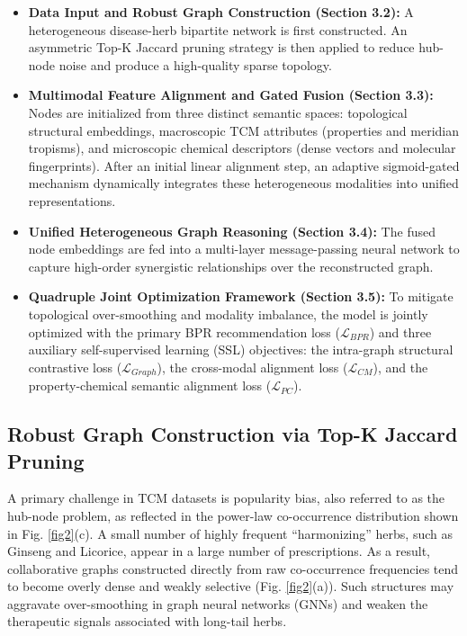\documentclass[a4paper,fleqn]{cas-dc}
\begin{document}
\begin{itemize}
    \item \textbf{Data Input and Robust Graph Construction (Section 3.2):} A heterogeneous disease-herb bipartite network is first constructed. An asymmetric Top-K Jaccard pruning strategy is then applied to reduce hub-node noise and produce a high-quality sparse topology.
    \item \textbf{Multimodal Feature Alignment and Gated Fusion (Section 3.3):} Nodes are initialized from three distinct semantic spaces: topological structural embeddings, macroscopic TCM attributes (properties and meridian tropisms), and microscopic chemical descriptors (dense vectors and molecular fingerprints). After an initial linear alignment step, an adaptive sigmoid-gated mechanism dynamically integrates these heterogeneous modalities into unified representations.
    \item \textbf{Unified Heterogeneous Graph Reasoning (Section 3.4):} The fused node embeddings are fed into a multi-layer message-passing neural network to capture high-order synergistic relationships over the reconstructed graph.
    \item \textbf{Quadruple Joint Optimization Framework (Section 3.5):} To mitigate topological over-smoothing and modality imbalance, the model is jointly optimized with the primary BPR recommendation loss ($\mathcal{L}_{BPR}$) and three auxiliary self-supervised learning (SSL) objectives: the intra-graph structural contrastive loss ($\mathcal{L}_{Graph}$), the cross-modal alignment loss ($\mathcal{L}_{CM}$), and the property-chemical semantic alignment loss ($\mathcal{L}_{PC}$).
\end{itemize}

\subsection{Robust Graph Construction via Top-K Jaccard Pruning}

A primary challenge in TCM datasets is popularity bias, also referred to as the hub-node problem, as reflected in the power-law co-occurrence distribution shown in Fig. \ref{fig2}(c). A small number of highly frequent ``harmonizing'' herbs, such as Ginseng and Licorice, appear in a large number of prescriptions. As a result, collaborative graphs constructed directly from raw co-occurrence frequencies tend to become overly dense and weakly selective (Fig. \ref{fig2}(a)). Such structures may aggravate over-smoothing in graph neural networks (GNNs) and weaken the therapeutic signals associated with long-tail herbs.
\end{document}
